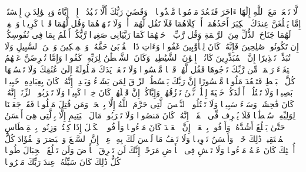 \startbuffer[\q:17:22]
لَّا تَجۡعَلۡ مَعَ ٱللَّهِ إِلَٰهًا ءَاخَرَ فَتَقۡعُدَ مَذۡمُومࣰا مَّخۡذُولࣰا%
\stopbuffer%
\startbuffer[\q:17:23]
۞ وَقَضَىٰ رَبُّكَ أَلَّا تَعۡبُدُوۤا۟ إِلَّاۤ إِیَّاهُ وَبِٱلۡوَٰلِدَیۡنِ إِحۡسَٰنًاۚ إِمَّا یَبۡلُغَنَّ عِندَكَ ٱلۡكِبَرَ أَحَدُهُمَاۤ أَوۡ كِلَاهُمَا فَلَا تَقُل لَّهُمَاۤ أُفࣲّ وَلَا تَنۡهَرۡهُمَا وَقُل لَّهُمَا قَوۡلࣰا كَرِیمࣰا%
\stopbuffer%
\startbuffer[\q:17:24]
وَٱخۡفِضۡ لَهُمَا جَنَاحَ ٱلذُّلِّ مِنَ ٱلرَّحۡمَةِ وَقُل رَّبِّ ٱرۡحَمۡهُمَا كَمَا رَبَّیَانِی صَغِیرࣰا%
\stopbuffer%
\startbuffer[\q:17:25]
رَّبُّكُمۡ أَعۡلَمُ بِمَا فِی نُفُوسِكُمۡۚ إِن تَكُونُوا۟ صَٰلِحِینَ فَإِنَّهُۥ كَانَ لِلۡأَوَّٰبِینَ غَفُورࣰا%
\stopbuffer%
\startbuffer[\q:17:26]
وَءَاتِ ذَا ٱلۡقُرۡبَىٰ حَقَّهُۥ وَٱلۡمِسۡكِینَ وَٱبۡنَ ٱلسَّبِیلِ وَلَا تُبَذِّرۡ تَبۡذِیرًا%
\stopbuffer%
\startbuffer[\q:17:27]
إِنَّ ٱلۡمُبَذِّرِینَ كَانُوۤا۟ إِخۡوَٰنَ ٱلشَّیَٰطِینِۖ وَكَانَ ٱلشَّیۡطَٰنُ لِرَبِّهِۦ كَفُورࣰا%
\stopbuffer%
\startbuffer[\q:17:28]
وَإِمَّا تُعۡرِضَنَّ عَنۡهُمُ ٱبۡتِغَاۤءَ رَحۡمَةࣲ مِّن رَّبِّكَ تَرۡجُوهَا فَقُل لَّهُمۡ قَوۡلࣰا مَّیۡسُورࣰا%
\stopbuffer%
\startbuffer[\q:17:29]
وَلَا تَجۡعَلۡ یَدَكَ مَغۡلُولَةً إِلَىٰ عُنُقِكَ وَلَا تَبۡسُطۡهَا كُلَّ ٱلۡبَسۡطِ فَتَقۡعُدَ مَلُومࣰا مَّحۡسُورًا%
\stopbuffer%
\startbuffer[\q:17:30]
إِنَّ رَبَّكَ یَبۡسُطُ ٱلرِّزۡقَ لِمَن یَشَاۤءُ وَیَقۡدِرُۚ إِنَّهُۥ كَانَ بِعِبَادِهِۦ خَبِیرَۢا بَصِیرࣰا%
\stopbuffer%
\startbuffer[\q:17:31]
وَلَا تَقۡتُلُوۤا۟ أَوۡلَٰدَكُمۡ خَشۡیَةَ إِمۡلَٰقࣲۖ نَّحۡنُ نَرۡزُقُهُمۡ وَإِیَّاكُمۡۚ إِنَّ قَتۡلَهُمۡ كَانَ خِطۡءࣰا كَبِیرࣰا%
\stopbuffer%
\startbuffer[\q:17:32]
وَلَا تَقۡرَبُوا۟ ٱلزِّنَىٰۤۖ إِنَّهُۥ كَانَ فَٰحِشَةࣰ وَسَاۤءَ سَبِیلࣰا%
\stopbuffer%
\startbuffer[\q:17:33]
وَلَا تَقۡتُلُوا۟ ٱلنَّفۡسَ ٱلَّتِی حَرَّمَ ٱللَّهُ إِلَّا بِٱلۡحَقِّۗ وَمَن قُتِلَ مَظۡلُومࣰا فَقَدۡ جَعَلۡنَا لِوَلِیِّهِۦ سُلۡطَٰنࣰا فَلَا یُسۡرِف فِّی ٱلۡقَتۡلِۖ إِنَّهُۥ كَانَ مَنصُورࣰا%
\stopbuffer%
\startbuffer[\q:17:34]
وَلَا تَقۡرَبُوا۟ مَالَ ٱلۡیَتِیمِ إِلَّا بِٱلَّتِی هِیَ أَحۡسَنُ حَتَّىٰ یَبۡلُغَ أَشُدَّهُۥۚ وَأَوۡفُوا۟ بِٱلۡعَهۡدِۖ إِنَّ ٱلۡعَهۡدَ كَانَ مَسۡءُولࣰا%
\stopbuffer%
\startbuffer[\q:17:35]
وَأَوۡفُوا۟ ٱلۡكَیۡلَ إِذَا كِلۡتُمۡ وَزِنُوا۟ بِٱلۡقِسۡطَاسِ ٱلۡمُسۡتَقِیمِۚ ذَٰلِكَ خَیۡرࣱ وَأَحۡسَنُ تَأۡوِیلࣰا%
\stopbuffer%
\startbuffer[\q:17:36]
وَلَا تَقۡفُ مَا لَیۡسَ لَكَ بِهِۦ عِلۡمٌۚ إِنَّ ٱلسَّمۡعَ وَٱلۡبَصَرَ وَٱلۡفُؤَادَ كُلُّ أُو۟لَٰۤئِكَ كَانَ عَنۡهُ مَسۡءُولࣰا%
\stopbuffer%
\startbuffer[\q:17:37]
وَلَا تَمۡشِ فِی ٱلۡأَرۡضِ مَرَحًاۖ إِنَّكَ لَن تَخۡرِقَ ٱلۡأَرۡضَ وَلَن تَبۡلُغَ ٱلۡجِبَالَ طُولࣰا%
\stopbuffer%
\startbuffer[\q:17:38]
كُلُّ ذَٰلِكَ كَانَ سَیِّئُهُۥ عِندَ رَبِّكَ مَكۡرُوهࣰا%
